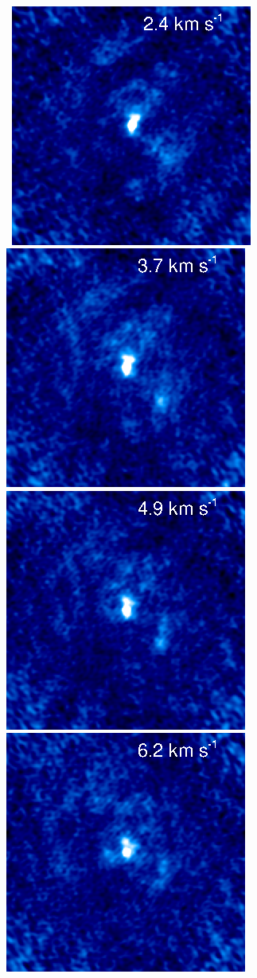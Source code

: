 \documentclass[preprint2]{aastex}
\begin{document}
\begin{figure}[hbt!]
{         }
\\
\mbox{
          \includegraphics[]{chan25.ps}
          \includegraphics[]{chan24.ps}
          \includegraphics[]{chan23.ps}
          \includegraphics[]{chan22.ps}
}
\end{figure}
\end{document}
